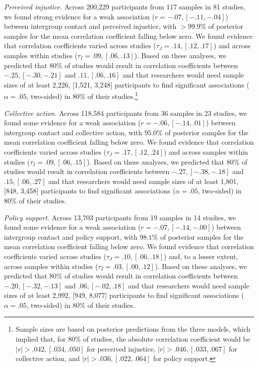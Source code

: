 \documentclass[
]{article}
\begin{document}
\emph{Perceived injustice.} Across 200,229 participants from 117 samples
in 81 studies, we found strong evidence for a weak association
(\(r = -.07, [-.11, -.04]\)) between intergroup contact and perceived
injustice, with \(>99.9\%\) of posterior samples for the mean
correlation coefficient falling below zero. We found evidence that
correlation coefficients varied across studies
(\(\tau_J = .14, [.12, .17]\)) and across samples within studies
(\(\tau_I = .09, [.06, .13]\)). Based on these analyses, we predicted
that 80\% of studies would result in correlation coefficients between
\(-.25, [-.30, -.21]\) and \(.11, [.06, .16]\) and that researchers
would need sample sizes of at least 2,226, {[}1,521, 3,248{]}
participants to find significant associations (\(\alpha = .05\),
two-sided) in 80\% of their studies.\footnote{Sample sizes are based on
  posterior predictions from the three models, which implied that, for
  80\% of studies, the absolute correlation coefficient would be
  \(|r| > .042, [.034, .050]\) for perceived injustice,
  \(|r| > .046, [.033, .067]\) for collective action, and
  \(|r| > .036, [.022, .064]\) for policy support.}

\emph{Collective action.} Across 118,584 participants from 36 samples in
23 studies, we found some evidence for a weak association
(\(r = -.06, [-.14, .01]\)) between intergroup contact and collective
action, with \(95.0\%\) of posterior samples for the mean correlation
coefficient falling below zero. We found evidence that correlation
coefficients varied across studies (\(\tau_J = .17, [.12, .24]\)) and
across samples within studies (\(\tau_I = .09, [.06, .15]\)). Based on
these analyses, we predicted that 80\% of studies would result in
correlation coefficients between \(-.27, [-.38, -.18]\) and
\(.15, [.06, .27]\) and that researchers would need sample sizes of at
least 1,801, {[}848, 3,458{]} participants to find significant
associations (\(\alpha = .05\), two-sided) in 80\% of their studies.

\emph{Policy support.} Across 13,703 participants from 19 samples in 14
studies, we found some evidence for a weak association
(\(r = -.07, [-.14, -.00]\)) between intergroup contact and policy
support, with \(98.1\%\) of posterior samples for the mean correlation
coefficient falling below zero. We found evidence that correlation
coefficients varied across studies (\(\tau_J = .10, [.06, .18]\)) and,
to a lesser extent, across samples within studies
(\(\tau_I = .03, [.00, .12]\)). Based on these analyses, we predicted
that 80\% of studies would result in correlation coefficients between
\(-.20, [-.32, -.13]\) and \(.06, [-.02, .18]\) and that researchers
would need sample sizes of at least 2,992, {[}949, 8,077{]} participants
to find significant associations (\(\alpha = .05\), two-sided) in 80\%
of their studies.
\end{document}

